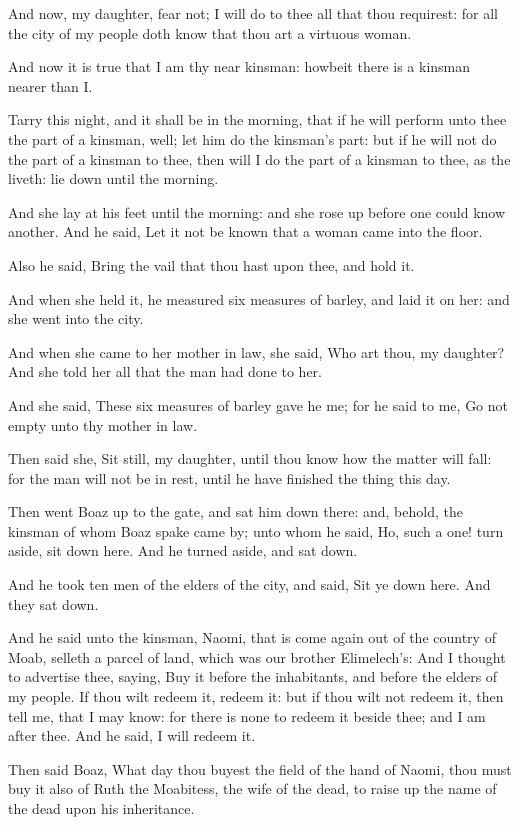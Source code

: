 \Verse And now, my daughter, fear not; I will do to thee all that thou requirest: for all the city of my people doth know that thou art a virtuous woman.

\Verse And now it is true that I am thy near kinsman: howbeit there is a kinsman nearer than I.

\Verse Tarry this night, and it shall be in the morning, that if he will perform unto thee the part of a kinsman, well; let him do the kinsman's part: but if he will not do the part of a kinsman to thee, then will I do the part of a kinsman to thee, as the \LORD liveth: lie down until the morning.

\Verse And she lay at his feet until the morning: and she rose up before one could know another. And he said, Let it not be known that a woman came into the floor.

\Verse Also he said, Bring the vail that thou hast upon thee, and hold it.

And when she held it, he measured six measures of barley, and laid it on her: and she went into the city.

\Verse And when she came to her mother in law, she said, Who art thou, my daughter? And she told her all that the man had done to her.

\Verse And she said, These six measures of barley gave he me; for he said to me, Go not empty unto thy mother in law.

\Verse Then said she, Sit still, my daughter, until thou know how the matter will fall: for the man will not be in rest, until he have finished the thing this day.


\Chapter
\Verse Then went Boaz up to the gate, and sat him down there: and, behold, the kinsman of whom Boaz spake came by; unto whom he said, Ho, such a one! turn aside, sit down here. And he turned aside, and sat down.

\Verse And he took ten men of the elders of the city, and said, Sit ye down here. And they sat down.

\Verse And he said unto the kinsman, Naomi, that is come again out of the country of Moab, selleth a parcel of land, which was our brother Elimelech's: \Verse And I thought to advertise thee, saying, Buy it before the inhabitants, and before the elders of my people. If thou wilt redeem it, redeem it: but if thou wilt not redeem it, then tell me, that I may know: for there is none to redeem it beside thee; and I am after thee. And he said, I will redeem it.

\Verse Then said Boaz, What day thou buyest the field of the hand of Naomi, thou must buy it also of Ruth the Moabitess, the wife of the dead, to raise up the name of the dead upon his inheritance.

